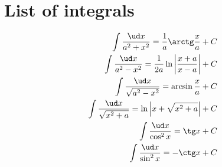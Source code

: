 \section{List of integrals}
\begin{align*}
	\int \frac{\ud x}{a^2 + x^2} = \frac{1}{a} \arctg \frac{x}{a} + C \\
    \int \frac{\ud x}{a^2 - x^2} = \frac{1}{2a} \ln \left\lvert \frac{x + a}{x - a} \right\rvert + C \\
    \int \frac{\ud x}{\sqrt{a^2 - x^2}} = \arcsin \frac{x}{a} + C \\
    \int \frac{\ud x}{\sqrt{x^2 + a}} = \ln \left\lvert x + \sqrt{x^2 + a} \right\rvert + C \\
    \int \frac{\ud x}{\cos^2 x} = \tg x + C \\
    \int \frac{\ud x}{\sin^2 x} = -\ctg x + C
\end{align*}
